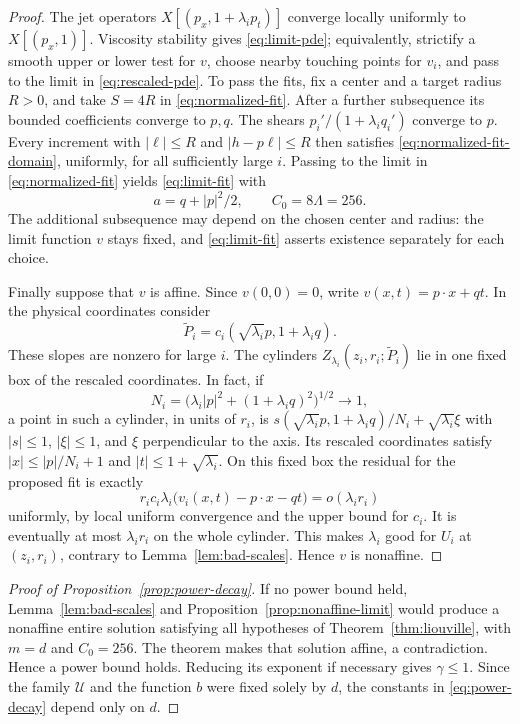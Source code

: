 \documentclass[11pt]{article}
\numberwithin{equation}{section}
\theoremstyle{definition}
\theoremstyle{remark}
\begin{document}
\begin{proof}
The jet operators $X[(p_x,1+\lambda_i p_t)]$ converge locally uniformly to $X[(p_x,1)]$. Viscosity stability gives \eqref{eq:limit-pde}; equivalently, strictify a smooth upper or lower test for $v$, choose nearby touching points for $v_i$, and pass to the limit in \eqref{eq:rescaled-pde}. To pass the fits, fix a center and a target radius $R>0$, and take $S=4R$ in \eqref{eq:normalized-fit}. After a further subsequence its bounded coefficients converge to $p,q$. The shears $p_i'/(1+\lambda_i q_i')$ converge to $p$. Every increment with $|\ell|\le R$ and $|h-p\ell|\le R$ then satisfies \eqref{eq:normalized-fit-domain}, uniformly, for all sufficiently large $i$. Passing to the limit in \eqref{eq:normalized-fit} yields \eqref{eq:limit-fit} with
\[
  a=q+|p|^2/2,\qquad C_0=8\Lambda=256.
\]
The additional subsequence may depend on the chosen center and radius: the limit function $v$ stays fixed, and \eqref{eq:limit-fit} asserts existence separately for each choice.

Finally suppose that $v$ is affine. Since $v(0,0)=0$, write $v(x,t)=p\cdot x+qt$. In the physical coordinates consider
\[
  \widetilde P_i=c_i(\sqrt{\lambda_i}p,1+\lambda_i q).
\]
These slopes are nonzero for large $i$. The cylinders $Z_{\lambda_i}(z_i,r_i;\widetilde P_i)$ lie in one fixed box of the rescaled coordinates. In fact, if
\[
  N_i=\bigl(\lambda_i|p|^2+(1+\lambda_i q)^2\bigr)^{1/2}\longrightarrow1,
\]
a point in such a cylinder, in units of $r_i$, is $s(\sqrt{\lambda_i}p,1+\lambda_i q)/N_i+\sqrt{\lambda_i}\xi$ with $|s|\le1$, $|\xi|\le1$, and $\xi$ perpendicular to the axis. Its rescaled coordinates satisfy $|x|\le |p|/N_i+1$ and $|t|\le1+\sqrt{\lambda_i}$. On this fixed box the residual for the proposed fit is exactly
\[
  r_i c_i\lambda_i\bigl(v_i(x,t)-p\cdot x-qt\bigr)=o(\lambda_i r_i)
\]
uniformly, by local uniform convergence and the upper bound for $c_i$. It is eventually at most $\lambda_i r_i$ on the whole cylinder. This makes $\lambda_i$ good for $U_i$ at $(z_i,r_i)$, contrary to Lemma~\ref{lem:bad-scales}. Hence $v$ is nonaffine.
\end{proof}

\begin{proof}[Proof of Proposition~\ref{prop:power-decay}]
If no power bound held, Lemma~\ref{lem:bad-scales} and Proposition~\ref{prop:nonaffine-limit} would produce a nonaffine entire solution satisfying all hypotheses of Theorem~\ref{thm:liouville}, with $m=d$ and $C_0=256$. The theorem makes that solution affine, a contradiction. Hence a power bound holds. Reducing its exponent if necessary gives $\gamma\le1$. Since the family $\mathcal U$ and the function $b$ were fixed solely by $d$, the constants in \eqref{eq:power-decay} depend only on $d$.
\end{proof}
\end{document}

